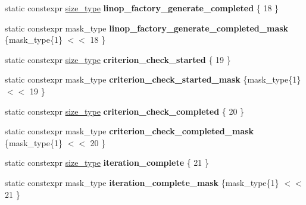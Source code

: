 \begin{DoxyCompactItemize}
\item 
\mbox{\label{classgko_1_1log_1_1Logger_aeea7da65130a892afe87ca5379906954}} 
static constexpr \hyperlink{namespacegko_a6e5c95df0ae4e47aab2f604a22d98ee7}{size\+\_\+type} {\bfseries linop\+\_\+factory\+\_\+generate\+\_\+completed} \{ 18 \}
\item 
\mbox{\label{classgko_1_1log_1_1Logger_aff50d8599cc08eee024e74b1512ad852}} 
static constexpr mask\+\_\+type {\bfseries linop\+\_\+factory\+\_\+generate\+\_\+completed\+\_\+mask} \{mask\+\_\+type\{1\} $<$$<$ 18 \}
\item 
\mbox{\label{classgko_1_1log_1_1Logger_ac9f5fd4c50ef63d69047114063bd2564}} 
static constexpr \hyperlink{namespacegko_a6e5c95df0ae4e47aab2f604a22d98ee7}{size\+\_\+type} {\bfseries criterion\+\_\+check\+\_\+started} \{ 19 \}
\item 
\mbox{\label{classgko_1_1log_1_1Logger_a9b94a434353d2dc07e0ed9f2928f316a}} 
static constexpr mask\+\_\+type {\bfseries criterion\+\_\+check\+\_\+started\+\_\+mask} \{mask\+\_\+type\{1\} $<$$<$ 19 \}
\item 
\mbox{\label{classgko_1_1log_1_1Logger_ab31e35810a6794d815e15675ff9f1ee5}} 
static constexpr \hyperlink{namespacegko_a6e5c95df0ae4e47aab2f604a22d98ee7}{size\+\_\+type} {\bfseries criterion\+\_\+check\+\_\+completed} \{ 20 \}
\item 
\mbox{\label{classgko_1_1log_1_1Logger_ac8b2b80e226f4d9652315fe66b171cef}} 
static constexpr mask\+\_\+type {\bfseries criterion\+\_\+check\+\_\+completed\+\_\+mask} \{mask\+\_\+type\{1\} $<$$<$ 20 \}
\item 
\mbox{\label{classgko_1_1log_1_1Logger_af93a011ce6927c7b538a048c9494ec8e}} 
static constexpr \hyperlink{namespacegko_a6e5c95df0ae4e47aab2f604a22d98ee7}{size\+\_\+type} {\bfseries iteration\+\_\+complete} \{ 21 \}
\item 
\mbox{\label{classgko_1_1log_1_1Logger_a4534d0027f88ccf1d52b4fa1ec6906e0}} 
static constexpr mask\+\_\+type {\bfseries iteration\+\_\+complete\+\_\+mask} \{mask\+\_\+type\{1\} $<$$<$ 21 \}

\end{DoxyCompactItemize}
